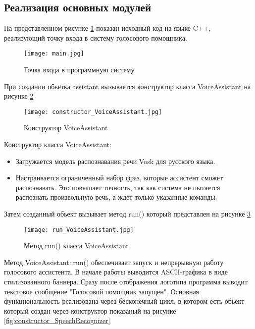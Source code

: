 \subsection{Реализация основных модулей}

На представленном рисунке \ref{fig:main.cpp} показан исходный код на языке C++, реализующий точку входа в систему голосового помощника.
\begin{figure}[H]
	\centering
	\texttt{[image: main.jpg]}
	\caption{Точка входа в программную систему}
	\label{fig:main.cpp}
\end{figure}

При создании обьетка assistant вызывается конструктор класса VoiceAssistant на рисунке \ref{fig:constructor_VoiceAssistant}

\begin{figure}[H]
	\centering
	\texttt{[image: constructor\_VoiceAssistant.jpg]}
	\caption{Конструктор VoiceAssistant}
	\label{fig:constructor_VoiceAssistant}
\end{figure}

Конструктор класса VoiceAssistant:
\begin{itemize}
 	\item Загружается модель распознавания речи Vosk для русского языка.

	\item Настраивается ограниченный набор фраз, которые ассистент сможет распознавать. Это повышает точность, так как система не пытается распознать произвольную речь, а ждёт только указанные команды.
\end{itemize}

Затем созданный обьект вызывает метод run() который представлен на рисунке \ref{fig:run_VoiceAssistant}

\begin{figure}[H]
	\centering
	\texttt{[image: run\_VoiceAssistant.jpg]}
	\caption{Метод run() класса VoiceAssistant}
	\label{fig:run_VoiceAssistant}
\end{figure}

Метод VoiceAssistant::run() обеспечивает запуск и непрерывную работу голосового ассистента. В начале работы выводится ASCII-графика в виде стилизованного баннера. Сразу после отображения логотипа программа выводит текстовое сообщение "Голосовой помощник запущен". Основная функциональность реализована через бесконечный цикл, в котором есть обьект который создан через конструктор показаный на рисунке  \ref{fig:constructor_SpeechRecognizer}


